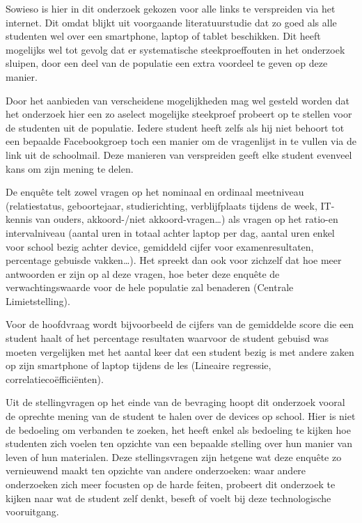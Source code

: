 Sowieso is hier in dit onderzoek gekozen voor alle links te verspreiden via het internet. Dit omdat blijkt uit voorgaande literatuurstudie dat zo goed als alle studenten wel over een smartphone, laptop of tablet beschikken. Dit heeft mogelijks wel tot gevolg dat er systematische steekproeffouten in het onderzoek sluipen, door een deel van de populatie een extra voordeel te geven op deze manier.

Door het aanbieden van verscheidene mogelijkheden mag wel gesteld worden dat het onderzoek hier een zo aselect mogelijke steekproef probeert op te stellen voor de studenten uit de populatie. Iedere student heeft zelfs als hij niet behoort tot een bepaalde Facebookgroep toch een manier om de vragenlijst in te vullen via de link uit de schoolmail. Deze manieren van verspreiden geeft elke student evenveel kans om zijn mening te delen.

De enquête telt zowel vragen op het nominaal en ordinaal meetniveau (relatiestatus, geboortejaar, studierichting, verblijfplaats tijdens de week, IT-kennis van ouders, akkoord-/niet akkoord-vragen…) als vragen op het ratio-en intervalniveau (aantal uren in totaal achter laptop per dag, aantal uren enkel voor school bezig achter device, gemiddeld cijfer voor examenresultaten, percentage gebuisde vakken…). Het spreekt dan ook voor zichzelf dat hoe meer antwoorden er zijn op al deze vragen, hoe beter deze enquête de verwachtingswaarde voor de hele populatie zal benaderen (Centrale Limietstelling).

Voor de hoofdvraag wordt bijvoorbeeld de cijfers van de gemiddelde score die een student haalt of het percentage resultaten waarvoor de student gebuisd was moeten vergelijken met het aantal keer dat een student bezig is met andere zaken op zijn smartphone of laptop tijdens de les (Lineaire regressie, correlatiecoëfficiënten).

Uit de stellingvragen op het einde van de bevraging hoopt dit onderzoek vooral de oprechte mening van de student te halen over de devices op school. Hier is niet de bedoeling om verbanden te zoeken, het heeft enkel als bedoeling te kijken hoe studenten zich voelen ten opzichte van een bepaalde stelling over hun manier van leven of hun materialen. Deze stellingsvragen zijn hetgene wat deze enquête zo vernieuwend maakt ten opzichte van andere onderzoeken: waar andere onderzoeken zich meer focusten op de harde feiten, probeert dit onderzoek te kijken naar wat de student zelf denkt, beseft of voelt bij deze technologische vooruitgang.

